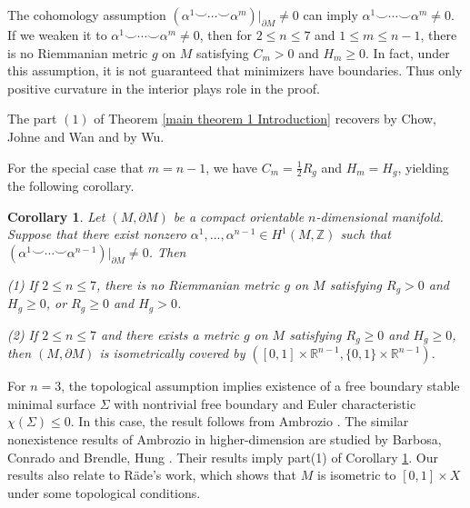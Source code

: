 \documentclass[11pt,letterpaper]{amsart}
\newtheorem{corollary}[theorem]{Corollary}
\theoremstyle{definition}
\theoremstyle{remark}
\numberwithin{equation}{section}
\begin{document}
The cohomology assumption $(\alpha^{1}\smile\cdots\smile \alpha^{m})|_{\partial M}\neq 0$ can imply $\alpha^{1}\smile\cdots\smile \alpha^{m}\neq 0$. If we weaken it to $\alpha^{1}\smile\cdots\smile \alpha^{m}\neq 0$, then for $2\leq n\leq 7$ and $1\leq m\leq n-1$, there is no Riemmanian metric $g$ on $M$ satisfying $C_{m}> 0$ and $H_{m}\geq 0$. In fact, under this assumption, it is not guaranteed that minimizers have boundaries. Thus only positive curvature in the interior plays role in the proof.

The part $(1)$ of Theorem \ref{main theorem 1 Introduction} recovers 
\cite[Theorem 1.5]{Chow_2023} by Chow, Johne and Wan  and \cite[Corollary 1.9]{wu2025comparisontheoremsintermediatericci} by Wu.

For the special case that $m=n-1$, we have $C_{m}=\frac{1}{2}R_{g}$ and $H_{m}=H_{g}$, yielding the following corollary.

\begin{corollary}\label{corollary of thm1 Introduction}
    Let $(M,\partial M)$ be a compact orientable $n$-dimensional manifold. Suppose that there exist nonzero $  \alpha^{1},...,\alpha^{n-1}\in H^{1}(M,\mathbb{Z})$ such that %
    $(\alpha^{1}\smile\cdots\smile \alpha^{n-1})|_{\partial M}\neq 0$. Then

    (1) If $2\leq n\leq 7$, there is no Riemmanian metric $g$ on $M$ satisfying $R_{g}> 0$ and $H_{g}\geq 0$, or $R_{g}\geq 0$ and $H_{g}> 0$.  

    (2) If $2\leq n\leq 7$ and there exists a metric $g$ on $M$ satisfying $R_{g}\geq 0$ and $H_{g}\geq 0$, then $(M,\partial M)$ is isometrically covered by $([0,1]\times \mathbb{R}^{n-1}, \{0,1\}\times \mathbb{R}^{n-1})$.
\end{corollary}

For $n=3$, the topological assumption implies existence of a free boundary stable minimal surface $\Sigma$ with nontrivial free boundary and Euler characteristic $\chi(\Sigma)\leq 0$. In this case, the result follows from  Ambrozio \cite{lucasrigiditythree}. The similar nonexistence results of Ambrozio in higher-dimension are studied by Barbosa, Conrado \cite{Barbosa-Conrado-disk} and Brendle, Hung \cite{brendle2024systolicinequalitieshorowitzmyersconjecture}. Their results imply part(1) of Corollary \ref{corollary of thm1 Introduction}. Our results also relate to R\"ade's work, which shows that $M$ is isometric to $[0,1]\times X$ under some topological conditions.
\end{document}
